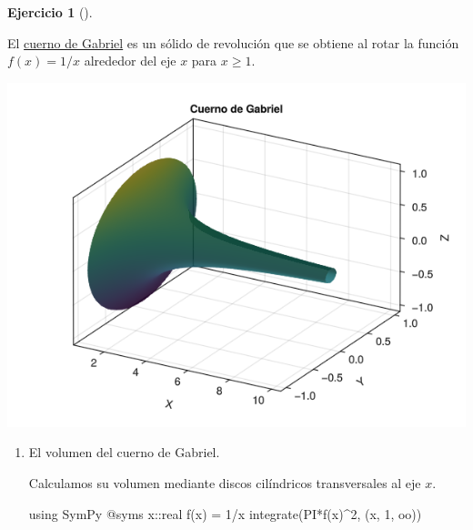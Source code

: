 \documentclass[
  a4paper,
]{scrreport}
\newenvironment{Shaded}{\begin{snugshade}}{\end{snugshade}}
\newcommand{\BuiltInTok}[1]{\textcolor[rgb]{0.00,0.23,0.31}{#1}}
\newcommand{\DataTypeTok}[1]{\textcolor[rgb]{0.68,0.00,0.00}{#1}}
\newcommand{\FloatTok}[1]{\textcolor[rgb]{0.68,0.00,0.00}{#1}}
\newcommand{\FunctionTok}[1]{\textcolor[rgb]{0.28,0.35,0.67}{#1}}
\newcommand{\ImportTok}[1]{\textcolor[rgb]{0.00,0.46,0.62}{#1}}
\newcommand{\NormalTok}[1]{\textcolor[rgb]{0.00,0.23,0.31}{#1}}
\newcommand{\OperatorTok}[1]{\textcolor[rgb]{0.37,0.37,0.37}{#1}}
\newcommand{\PreprocessorTok}[1]{\textcolor[rgb]{0.68,0.00,0.00}{#1}}
\theoremstyle{definition}
\newtheorem{exercise}{Ejercicio}[chapter]
\theoremstyle{remark}
\begin{document}
\begin{exercise}[]\protect\hypertarget{exr-superficie-solido-revolucion}{}\label{exr-superficie-solido-revolucion}

El \href{https://es.wikipedia.org/wiki/Cuerno_de_Gabriel}{cuerno de
Gabriel} es un sólido de revolución que se obtiene al rotar la función
\(f(x)=1/x\) alrededor del eje \(x\) para \(x\geq 1\).

\includegraphics{06-integrales_files/figure-pdf/cell-41-output-1.png}

\begin{enumerate}
\def\labelenumi{\alph{enumi}.}
\item
  El volumen del cuerno de Gabriel.

  \begin{tcolorbox}[enhanced jigsaw, bottomtitle=1mm, rightrule=.15mm, left=2mm, colback=white, title=\textcolor{quarto-callout-tip-color}{\faLightbulb}\hspace{0.5em}{Solución}, bottomrule=.15mm, colframe=quarto-callout-tip-color-frame, toprule=.15mm, leftrule=.75mm, opacityback=0, coltitle=black, breakable, colbacktitle=quarto-callout-tip-color!10!white, arc=.35mm, toptitle=1mm, titlerule=0mm, opacitybacktitle=0.6]

  Calculamos su volumen mediante discos cilíndricos transversales al eje
  \(x\).

\begin{Shaded}
\begin{Highlighting}[]
\ImportTok{using} \BuiltInTok{SymPy}
\PreprocessorTok{@syms}\NormalTok{ x}\OperatorTok{::}\DataTypeTok{real}
\FunctionTok{f}\NormalTok{(x) }\OperatorTok{=} \FloatTok{1}\OperatorTok{/}\NormalTok{x}
\FunctionTok{integrate}\NormalTok{(}\FunctionTok{PI*f}\NormalTok{(x)}\OperatorTok{\^{}}\FloatTok{2}\NormalTok{, (x, }\FloatTok{1}\NormalTok{, oo))}
\end{Highlighting}
\end{Shaded}


\end{tcolorbox}
\end{enumerate}
\end{exercise}
\end{document}
